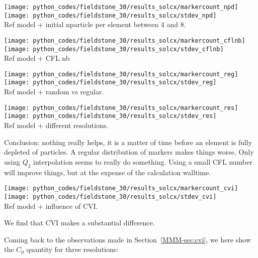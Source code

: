 \begin{center}
\texttt{[image: python\_codes/fieldstone\_30/results\_solcx/markercount\_npd]}
\texttt{[image: python\_codes/fieldstone\_30/results\_solcx/stdev\_npd]}\\
{\captionfont Ref model + initial nparticle per element between 4 and 8.}
\end{center}

\begin{center}
\texttt{[image: python\_codes/fieldstone\_30/results\_solcx/markercount\_cflnb]}
\texttt{[image: python\_codes/fieldstone\_30/results\_solcx/stdev\_cflnb]}\\
{\captionfont Ref model + CFL nb}
\end{center}

\begin{center}
\texttt{[image: python\_codes/fieldstone\_30/results\_solcx/markercount\_reg]}
\texttt{[image: python\_codes/fieldstone\_30/results\_solcx/stdev\_reg]}\\
{\captionfont Ref model + random vs regular.} 
\end{center}

\begin{center}
\texttt{[image: python\_codes/fieldstone\_30/results\_solcx/markercount\_res]}
\texttt{[image: python\_codes/fieldstone\_30/results\_solcx/stdev\_res]}\\
{\captionfont Ref model + different resolutions.}
\end{center}

Conclusion: nothing really helps, it is a matter of time before an element is fully depleted of particles. 
A regular distribution of markers makes things worse. Only using $Q_2$ interpolation seems to really do 
something. Using a small CFL number will improve things, but at the expense of the calculation walltime. 


\begin{center}
\texttt{[image: python\_codes/fieldstone\_30/results\_solcx/markercount\_cvi]}
\texttt{[image: python\_codes/fieldstone\_30/results\_solcx/stdev\_cvi]}\\
{\captionfont Ref model + influence of CVI.} 
\end{center}

We find that CVI makes a substantial difference. 


Coming back to the observations made in Section~\ref{MMM-sec:cvi}, 
we here show the $C_0$ quantity for three resolutions:

